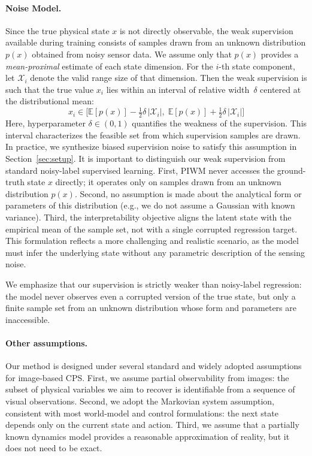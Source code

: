 \documentclass[nonacm,sigconf]{acmart}
\begin{document}
\paragraph{Noise Model.}
Since the true physical state $x$ is not directly observable, the weak supervision available during training consists of samples drawn from an unknown distribution $p(x)$ obtained from noisy sensor data.
We assume only that $p(x)$ provides a \emph{mean-proximal} estimate of each state dimension. 
For the $i$-th state component, let $\mathcal{X}_i$ denote the valid range size of that dimension. Then the weak supervision is such that the true value $x_i$ lies within an  interval of relative width~$\delta$ centered at the distributional mean:
\[
x_i \in 
\Big[
\mathbb{E}[p(x)] - \tfrac{1}{2}\delta\,|\mathcal{X}_i|,\;
\mathbb{E}[p(x)] + \tfrac{1}{2}\delta\,|\mathcal{X}_i|
\Big]
\]
Here, hyperparameter $\delta\in(0,1)$ quantifies the weakness of the supervision.  
This interval characterizes the feasible set from which supervision samples are drawn. In practice, we synthesize biased supervision noise to satisfy this assumption in Section~\ref{sec:setup}. It is important to distinguish our weak supervision from standard noisy-label supervised learning. First, PIWM never accesses the ground-truth state $x$ directly; it operates only on samples drawn from an unknown distribution $p(x)$. Second, no assumption is made about the analytical form or parameters of this distribution (e.g., we do not assume a Gaussian with known variance). Third, the interpretability objective aligns the latent state with the empirical mean of the sample set, not with a single corrupted regression target. This formulation reflects a more challenging and realistic scenario, as the model must infer the underlying state without any parametric description of the sensing noise.

We emphasize that our supervision is strictly weaker than noisy-label regression: the model never observes even a corrupted version of the true state, but only a finite sample set from an unknown distribution whose form and parameters are inaccessible.



\paragraph{Other assumptions.} 
Our method is designed under several standard and widely adopted assumptions for image-based CPS. First, we assume partial observability from images: the subset of physical variables we aim to recover is identifiable from a sequence of visual observations. Second, we adopt the Markovian system assumption, consistent with most world-model and control formulations: the next state depends only on the current state and action. Third, we assume that a partially known dynamics model provides a reasonable approximation of reality, but it does not need to be exact.
\end{document}
